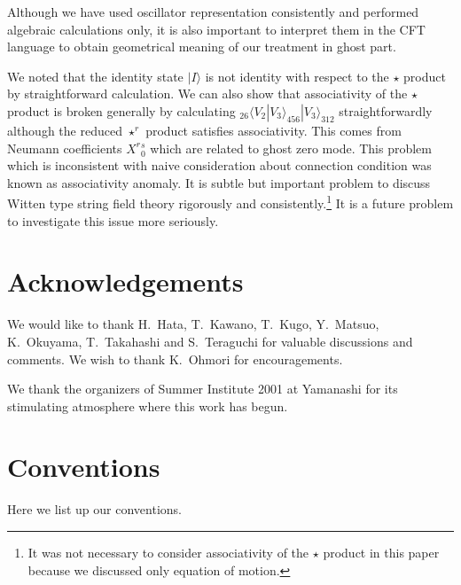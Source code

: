 \documentclass[12pt,a4paper]{article}
\begin{document}
Although we have used oscillator representation consistently and performed algebraic calculations only, it is also important to interpret them in the CFT language to obtain geometrical meaning of our treatment in ghost part.

We noted that the identity state $|I\rangle$ is not identity with respect to the $\star$ product by straightforward calculation. 
We can also show that associativity of the $\star$ product is broken generally by calculating  ${}_{26}\langle V_2|V_3\rangle_{456}|V_3\rangle_{312}$  straightforwardly although the reduced $\star^r$ product satisfies associativity. This comes from Neumann coefficients $X^r{}^s_0$ which are related to ghost zero mode. This problem which is inconsistent with naive consideration about connection condition was known as associativity anomaly.\cite{STR}  It is subtle but important problem to discuss Witten type string field theory rigorously and consistently.\footnote{
It was not necessary to consider associativity of the $\star$ product
in this paper because we discussed only equation of motion. 
} It is a future problem to investigate this issue more seriously.



\section*{Acknowledgements}
We would like to thank H.~Hata, T.~Kawano, T.~Kugo,  Y.~Matsuo, K.~Okuyama, T.~Takahashi and S.~Teraguchi for valuable discussions and comments.
We wish to thank K.~Ohmori for encouragements.

We thank the organizers of Summer Institute 2001 at Yamanashi
for its stimulating atmosphere where this work has begun.


\appendix

\section{Conventions}

Here we list up our conventions.
\end{document}
